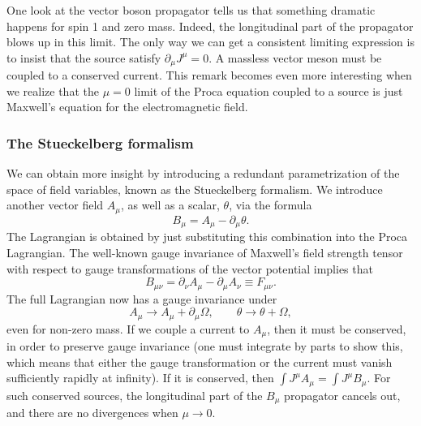 
One look at the vector boson propagator tells us that something dramatic happens
for spin 1 and zero mass. Indeed, the longitudinal part of the propagator blows up in
this limit. The only way we can get a consistent limiting expression is to insist that the
source satisfy $\partial_\mu J^\mu=0$. A massless vector meson must be coupled to a conserved current.
This remark becomes even more interesting when we realize that the $\mu=0$ limit of the
Proca equation coupled to a source is just Maxwell’s equation for the electromagnetic
field.

\subsubsection{The Stueckelberg formalism}

We can obtain more insight by introducing a redundant parametrization of the space
of field variables, known as the Stueckelberg formalism. We introduce another vector
field $A_\mu$, as well as a scalar, $\theta$, via the formula
\begin{equation*}
  B_\mu=A_\mu-\partial_\mu\theta.
\end{equation*}
The Lagrangian is obtained by just substituting this combination into the Proca
Lagrangian. The well-known gauge invariance of Maxwell’s field strength tensor with
respect to gauge transformations of the vector potential implies that
\begin{equation*}
  B_{\mu\nu}=\partial_\nu A_\mu-\partial_\mu A_\nu\equiv F_{\mu\nu}.
\end{equation*}
The full Lagrangian now has a gauge invariance under
\begin{equation*}
  A_\mu\longrightarrow A_\mu+\partial_\mu\Omega,
  \qquad \theta\longrightarrow\theta+\Omega,
\end{equation*}
even for non-zero mass. If we couple a current to $A_\mu$, then it must be conserved, in order
to preserve gauge invariance (one must integrate by parts to show this, which means
that either the gauge transformation or the current must vanish sufficiently rapidly at
infinity). If it is conserved, then $\int J^\mu A_\mu=\int J^\mu B_\mu$. For such conserved sources, the
longitudinal part of the $B_\mu$ propagator cancels out, and there are no divergences when
$\mu\to0$.

